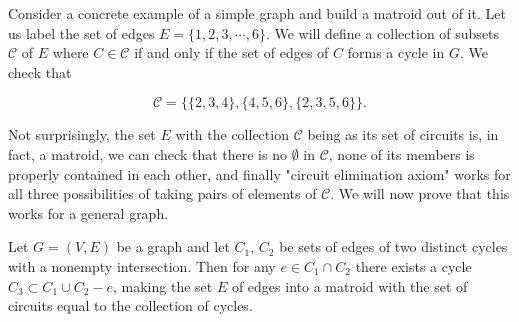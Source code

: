 Consider a concrete example of a simple graph and build a matroid out of it. Let us label the set of edges $E = \{1, 2, 3, \cdots, 6\}$. We will define a collection of subsets $\mathcal{C}$ of $E$ where $C \in \mathcal{C}$ if and only if the set of edges of $C$ forms a cycle in $G$. We check that 

    $$\mathcal{C} = \{\{2,3,4\}, \{4,5,6\}, \{2, 3, 5, 6\}\}.$$

Not surprisingly, the set $E$ with the collection $\mathcal{C}$ being as its set of circuits is, in fact, a matroid, we can check that there is no $\emptyset$ in $\mathcal{C}$, none of its members is properly contained in each other, and finally "circuit elimination axiom" works for all three possibilities of taking pairs of elements of $\mathcal{C}$. We will now prove that this works for a general graph.

\begin{theorem}
Let $G = (V, E)$ be a graph and let $C_1$, $C_2$ be sets of edges of two distinct cycles with a nonempty intersection. Then for any $e \in C_1 \cap C_2$ there exists a cycle $C_3 \subset C_1 \cup C_2 -e$, making the set $E$ of edges into a matroid with the set of circuits equal to the collection of cycles.
\end{theorem}

